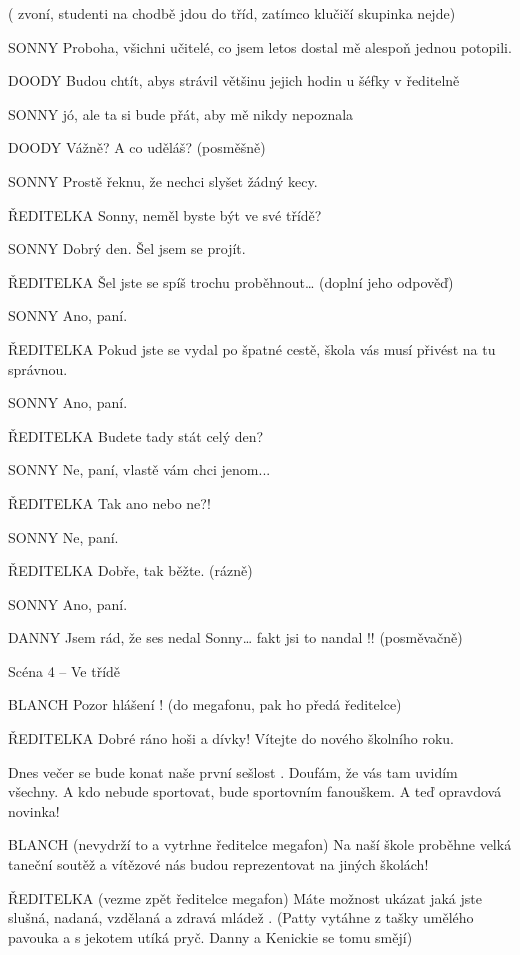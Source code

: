 ( zvoní, studenti na chodbě jdou do tříd, zatímco klučičí skupinka nejde)

SONNY         Proboha, všichni učitelé, co jsem letos dostal mě alespoň jednou potopili.

DOODY        Budou chtít, abys strávil většinu jejich hodin u šéfky v ředitelně

SONNY        jó, ale ta si bude přát, aby mě nikdy nepoznala

DOODY        Vážně? A co uděláš? (posměšně)

SONNY        Prostě řeknu, že nechci slyšet žádný kecy. 

ŘEDITELKA         Sonny, neměl byste být ve své třídě?

SONNY         Dobrý den. Šel jsem se projít.

ŘEDITELKA        Šel jste se spíš trochu proběhnout… (doplní jeho odpověď)

SONNY        Ano, paní.

ŘEDITELKA        Pokud jste se vydal po špatné cestě, škola vás musí přivést na tu                 správnou.

SONNY        Ano, paní.

ŘEDITELKA        Budete tady stát celý den?

SONNY        Ne, paní, vlastě vám chci jenom...

ŘEDITELKA        Tak ano nebo ne?!

SONNY        Ne, paní.

ŘEDITELKA        Dobře, tak běžte. (rázně)

SONNY        Ano, paní.

DANNY        Jsem rád, že ses nedal  Sonny… fakt jsi to nandal !! (posměvačně)

Scéna 4 – Ve třídě 

      BLANCH            Pozor hlášení ! (do megafonu, pak ho předá ředitelce)

        ŘEDITELKA                  Dobré ráno hoši a dívky! Vítejte do nového školního roku.

      Dnes večer se bude konat naše první sešlost . Doufám, že vás tam  uvidím všechny. A kdo nebude sportovat, bude sportovním fanouškem. A  teď opravdová novinka!  

      BLANCH            (nevydrží to a vytrhne ředitelce megafon) Na naší škole proběhne velká taneční soutěž  a vítězové nás budou reprezentovat na jiných školách!

      ŘEDITELKA        (vezme zpět ředitelce megafon) Máte možnost ukázat jaká jste slušná, nadaná, vzdělaná a zdravá mládež . (Patty vytáhne z tašky umělého pavouka a s jekotem utíká pryč.         Danny a Kenickie se tomu smějí)        

